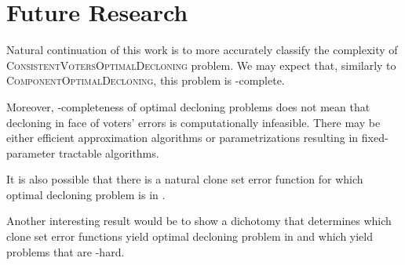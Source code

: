 \section{Future Research}

Natural continuation of this work is to more accurately classify the complexity of \textsc{ConsistentVotersOptimalDecloning} problem.
We may expect that, similarly to \textsc{ComponentOptimalDecloning}, this problem is \np-complete.

Moreover, \np-completeness of optimal decloning problems does not mean
that decloning in face of voters' errors is computationally infeasible.
There may be either efficient approximation algorithms
or parametrizations resulting in fixed-parameter tractable algorithms.

It is also possible that there is a natural clone set error function
for which optimal decloning problem is in \p.

Another interesting result would be to show a dichotomy that determines
which clone set error functions yield optimal decloning problem in \p
and which yield problems that are \np-hard.
